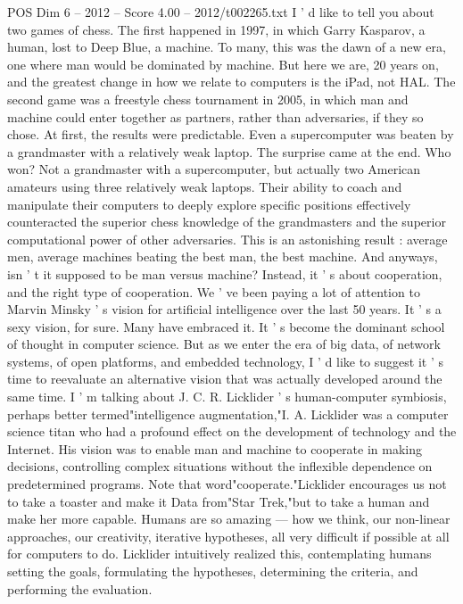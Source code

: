 \begin{textsample}{POS Dim 6 – 2012 – Score 4.00 – 2012/t002265.txt}  \label{ex:f6_pos_042}
I ' d like to tell you about two games of chess.
The first happened in 1997, in which Garry Kasparov, a human, lost to Deep Blue, a machine.
To many, this was the dawn of a new era, one where man would be dominated by machine.
But here we are, 20 years on, and the greatest change in how we relate to computers is the iPad, not HAL.
The second game was a freestyle chess tournament in 2005, in which man and machine could enter together as partners, rather than adversaries, if they so chose.
At first, the results were predictable.
Even a supercomputer was beaten by a grandmaster with a relatively weak laptop.
The surprise came at the end.
Who won?
Not a grandmaster with a supercomputer, but actually two American amateurs using three relatively weak laptops.
Their ability to coach and manipulate their computers to deeply explore specific positions effectively counteracted the superior chess knowledge of the grandmasters and the superior computational power of other adversaries.
This is an astonishing result : average men, average machines beating the best man, the best machine.
And anyways, isn ' t it supposed to be man versus machine?
Instead, it ' s about cooperation, and the right type of cooperation.
We ' ve been paying a lot of attention to Marvin Minsky ' s vision for artificial intelligence over the last 50 years.
It ' s a sexy vision, for sure.
Many have embraced it.
It ' s become the dominant school of thought in computer science.
But as we enter the era of big data, of network systems, of open platforms, and embedded technology, I ' d like to suggest it ' s time to reevaluate an alternative vision that was actually developed around the same time.
I ' m talking about J.
C.
R.
Licklider ' s human-computer symbiosis, perhaps better termed"intelligence augmentation,"I.
A.
Licklider was a computer science titan who had a profound effect on the development of technology and the Internet.
His vision was to enable man and machine to cooperate in making decisions, controlling complex situations without the inflexible dependence on predetermined programs.
Note that word"cooperate."Licklider encourages us not to take a toaster and make it Data from"Star Trek,"but to take a human and make her more capable.
Humans are so amazing — how we think, our non-linear approaches, our creativity, iterative hypotheses, all very difficult if possible at all for computers to do.
Licklider intuitively realized this, contemplating humans setting the goals, formulating the hypotheses, determining the criteria, and performing the evaluation.

\end{textsample}
